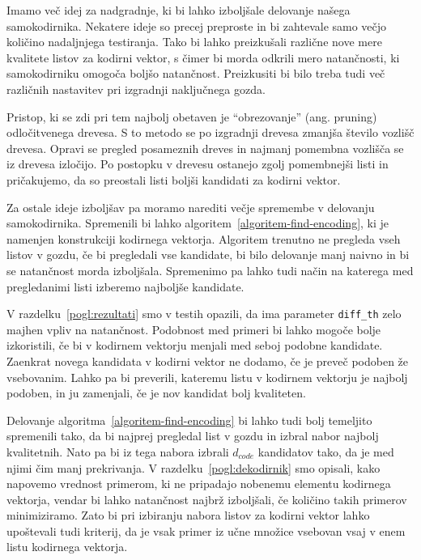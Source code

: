 \documentclass[12pt,a4paper,twoside]{article}
\theoremstyle{definition} %
\theoremstyle{plain} %
\numberwithin{equation}{section}  %
\begin{document}

Imamo več idej za nadgradnje, ki bi lahko izboljšale delovanje našega samokodirnika.
Nekatere ideje so precej preproste in bi zahtevale samo večjo količino nadaljnjega testiranja.
Tako bi lahko preizkušali različne nove mere kvalitete listov za kodirni vektor, s čimer bi morda odkrili mero natančnosti, ki samokodirniku omogoča boljšo natančnost.
Preizkusiti bi bilo treba tudi več različnih nastavitev pri izgradnji naključnega gozda.

Pristop, ki se zdi pri tem najbolj obetaven je ``obrezovanje'' (ang. pruning) odločitvenega drevesa. %
S to metodo se po izgradnji drevesa zmanjša število vozlišč drevesa.
Opravi se pregled posameznih dreves in najmanj pomembna vozlišča se iz drevesa izločijo.
Po postopku v drevesu ostanejo zgolj pomembnejši listi in pričakujemo, da so preostali listi boljši kandidati za kodirni vektor.

Za ostale ideje izboljšav pa moramo narediti večje spremembe v delovanju samokodirnika.
Spremenili bi lahko algoritem~\ref{algoritem-find-encoding}, ki je namenjen konstrukciji kodirnega vektorja.
Algoritem trenutno ne pregleda vseh listov v gozdu, če bi pregledali vse kandidate, bi bilo delovanje manj naivno in bi se natančnost morda izboljšala.
Spremenimo pa lahko tudi način na katerega med pregledanimi listi izberemo najboljše kandidate.

V razdelku~\ref{pogl:rezultati} smo v testih opazili, da ima parameter \texttt{diff\_th} zelo majhen vpliv na natančnost.
Podobnost med primeri bi lahko mogoče bolje izkoristili, če bi v kodirnem vektorju menjali med seboj podobne kandidate.
Zaenkrat novega kandidata v kodirni vektor ne dodamo, če je preveč podoben že vsebovanim.
Lahko pa bi preverili, kateremu listu v kodirnem vektorju je najbolj podoben, in ju zamenjali, če je nov kandidat bolj kvaliteten.

Delovanje algoritma~\ref{algoritem-find-encoding} bi lahko tudi bolj temeljito spremenili tako, da bi najprej pregledal list v gozdu in izbral nabor najbolj kvalitetnih.
Nato pa bi iz tega nabora izbrali $d_{code}$ kandidatov tako, da je med njimi čim manj prekrivanja. %
V razdelku~\ref{pogl:dekodirnik} smo opisali, kako napovemo vrednost primerom, ki ne pripadajo nobenemu elementu kodirnega vektorja, vendar bi lahko natančnost najbrž izboljšali, če količino takih primerov minimiziramo.
Zato bi pri izbiranju nabora listov za kodirni vektor lahko upoštevali tudi kriterij, da je vsak primer iz učne množice vsebovan vsaj v enem listu kodirnega vektorja.
\end{document}
